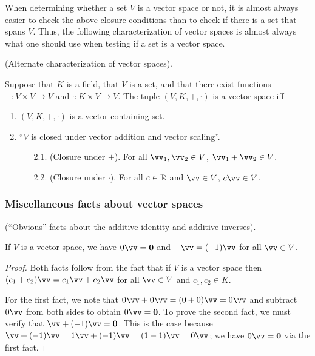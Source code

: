 When determining whether a set $V$ is a vector space or not, it is almost always easier to check the above closure conditions than to check if there is a set that spans $V$. Thus, the following characterization of vector spaces is almost always what one should use when testing if a set is a vector space.

\begin{theorem}
    (Alternate characterization of vector spaces).
    
    Suppose that $K$ is a field, that $V$ is a set, and that there exist functions $+:V \times V \rightarrow V$ and $\cdot:K \times V \rightarrow V$. The tuple $(V, K, +, \cdot)$ is a vector space iff
    
    \begin{enumerate}
        \item $(V, K, +, \cdot)$ is a vector-containing set.
        \item ``$V$ is closed under vector addition and vector scaling''.
        \begin{enumerate}
            \item[2.1.] (Closure under $+$). For all $\vv_1, \vv_2 \in V$, $\vv_1 + \vv_2 \in V$.
            \item[2.2.] (Closure under $\cdot$). For all $c \in \mathbb{R}$ and $\vv \in V$, $c \vv \in V$.
        \end{enumerate}
    \end{enumerate}
\end{theorem}

\subsubsection*{Miscellaneous facts about vector spaces}

\begin{theorem}
    (``Obvious'' facts about the additive identity and additive inverses).
    
    If $V$ is a vector space, we have $0 \vv = \mathbf{0}$ and $-\vv = (-1) \vv$ for all $\vv \in V$.
\end{theorem}

\begin{proof}
   Both facts follow from the fact that if $V$ is a vector space then $(c_1 + c_2)\vv = c_1 \vv + c_2 \vv$ for all $\vv \in V$ and $c_1, c_2 \in K$.
   
   For the first fact, we note that $0 \vv + 0 \vv = (0 + 0) \vv = 0 \vv$ and subtract $0 \vv$ from both sides to obtain $0 \vv = \mathbf{0}$. To prove the second fact, we must verify that $\vv + (-1) \vv = \mathbf{0}$. This is the case because $\vv + (-1) \vv = 1 \vv + (-1) \vv = (1 - 1) \vv = 0 \vv$; we have $0 \vv = \mathbf{0}$ via the first fact.
\end{proof}


